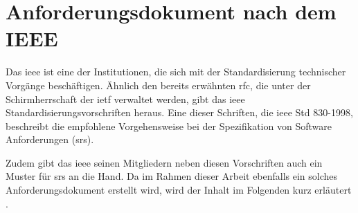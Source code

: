 \section{Anforderungsdokument nach dem IEEE}
Das \ac{ieee} ist eine der Institutionen, die sich mit der Standardisierung technischer Vorgänge beschäftigen. Ähnlich den bereits erwähnten \ac{rfc}, die unter der Schirmherrschaft der \ac{ietf} verwaltet werden, gibt das \ac{ieee} Standardisierungsvorschriften heraus. Eine dieser Schriften, die \ac{ieee} Std 830-1998, beschreibt die empfohlene Vorgehensweise bei der Spezifikation von Software Anforderungen (\ac{srs}).

Zudem gibt das \ac{ieee} seinen Mitgliedern neben diesen Vorschriften auch ein Muster für \ac{srs} an die Hand. Da im Rahmen dieser Arbeit ebenfalls ein solches Anforderungsdokument erstellt wird, wird der Inhalt im Folgenden kurz erläutert \citep[vgl.][S. 11 ff.]{ieee1998}.
